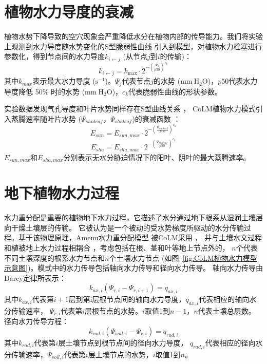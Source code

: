 \section{植物水力导度的衰减}\label{植物水力导度的衰减}
植物水势下降导致的空穴现象会严重降低水分在植物内部的传导能力。我们将实验上观测到水力导度随水势变化的S型脆弱性曲线 
\citep{sperry1988method,gentine2016allometry,neufeld1992genotypic,pammenter1998mathematical,plaut2012hydraulic}
 引入到模型，对植物水力栓塞进行参数化，得到节点间的水力导度$k_{i\gets j}$ (从节点$j$到$i$的传输)：
 \begin{equation}
k_{i \leftarrow j}=k_{\max } \cdot 2^{-\left(\frac{\Psi_{\mathbf{j}}}{p 50}\right)^{c_{k}}}
\end{equation}
其中$k_{max}$表示最大水力导度 ($\mathrm{s^{-1}}$)。$\Psi_j$代表节点$j$的水势 ($\mathrm{mm\  H_2O}$)，$p50$代表水力导度降低 50\% 时的水势 ($\mathrm{mm\ H_2O}$)，$c_k$代表脆弱性曲线的形状参数。



实验数据发现气孔导度和叶片水势同样存在S型曲线关系 \citep{klein2014variability}，
CoLM植物水力模式引入蒸腾速率随叶片水势 ($\Psi_{sunleaf}$，$\Psi_{shaleaf}$)的衰减函数 \citep{kennedy2019implementing}：
\begin{equation}\label{e_sun_a}
E_{ {sun }}=E_{ {sun,max }} \cdot 2^{-\left(\frac{\Psi_{ {sunleaf }}}{p 50}\right)^{c_{k}}}
\end{equation}
\begin{equation}\label{e_sha_a}
E_{ {sha }}=E_{ {sha,max }} \cdot 2^{-\left(\frac{\Psi_{ {shaleaf }}}{p 50}\right)^{c_{k}}}
\end{equation}
$E_{sun,max} $和$E_{sha,max}$分别表示无水分胁迫情况下的阳叶、阴叶的最大蒸腾速率。

\section{地下植物水力过程}\label{地下植物水力过程}
水力重分配是重要的植物地下水力过程，它描述了水分通过地下根系从湿润土壤层向干燥土壤层的传输。
它被认为是一个被动的受水势梯度所驱动的水分传输过程。基于该物理原理，Amenu水力重分配模型 \citep{amenu2008}被CoLM采用 \citep{zhu2017incorporating}，
并与土壤水文过程和植被地上水力过程相耦合 \citep{li2021new}，考虑包括在根、茎和叶等地上节点外的， 
$n$个代表不同土壤深度的根系水力节点和$n$个土壤水力节点 (如图~\ref{fig:CoLM植物水力模型示意图})。模式中的水力传导包括轴向水力传导和径向水力传导。
轴向水力传导由Darcy定律所表示：
\begin{equation}\label{k_axi}
k_{ax,i}\left(\Psi_{r,i}-\Psi_{r,i+1}\right)=q_{ax,i}
\end{equation}
其中$k_{ax,i}$代表第$i+1$层到第i层根节点间的轴向水力导度，$q_{ax,i}$代表相应的轴向水分传输速率，
$\Psi_{r,i}$代表第$i$层根节点的水势。$i$取值1到$n-1$，$n$代表土壤总层数。\\
径向水力传导方程：
\begin{equation}\label{k_radi}
k_{rad,i}\left(\Psi_{soil,i}-\Psi_{r,i}\right)=q_{rad,i}
\end{equation}
其中$k_{rad,i}$代表第$i$层土壤节点到根节点间的径向水力导度，
$q_{rad,i}$代表相应的径向水分传输速率，$\Psi_{soil,i}$代表第$i$层土壤节点的水势，$i$取值1到$n$。



